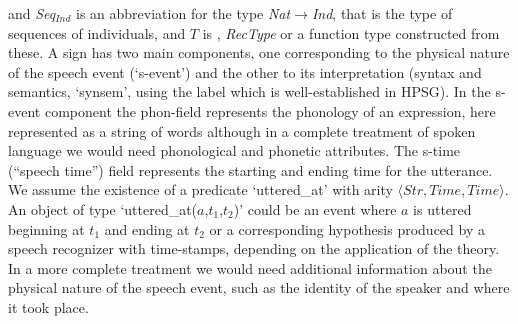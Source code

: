 and \textit{Seq}$_{\mathit{Ind}}$ is an abbreviation for the type
\textit{Nat}$\rightarrow$\textit{Ind}, that is the type of sequences
of individuals, and $T$ is ,
\textit{RecType} or a function type constructed from these. 
A sign 
has two main components, one corresponding to the physical nature of
the speech event (`s-event') and the other to its interpretation
(syntax and semantics, `synsem', using the label which is
well-established in HPSG).   In the s-event component the
phon-field represents the phonology of an expression, here represented
as a string of words although in a complete treatment of spoken
language we would need phonological and phonetic attributes.  The
s-time (``speech time'') field represents the starting and ending time
for the utterance.  We assume the existence of a predicate
`uttered\_at' with arity
$\langle\mathit{Str},\mathit{Time},\mathit{Time}\rangle$.  An object of type
`uttered\_at($a$,$t_1$,$t_2$)' could be an event where $a$ is uttered
beginning at $t_1$ and ending at $t_2$ or a corresponding hypothesis
produced by a speech recognizer with time-stamps, depending on the application of the
theory.  In a more complete treatment we would need additional
information about the physical nature of the speech event, such as the
identity of the speaker and where it took place.  

